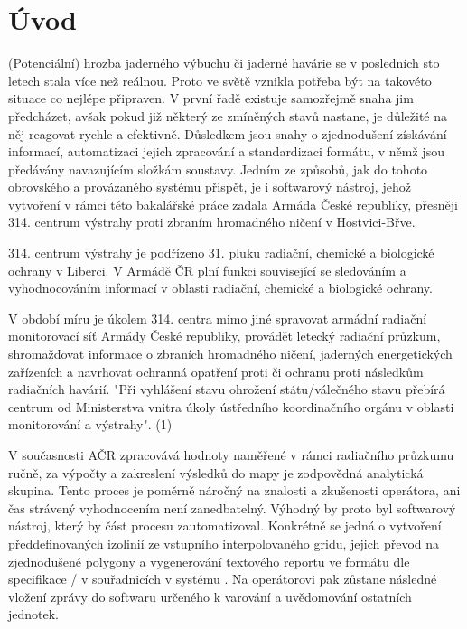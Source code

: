 \chapter{Úvod}
\label{1-uvod}




(Potenciální) hrozba jaderného výbuchu či jaderné havárie se v posledních sto letech stala více než reálnou. Proto ve světě vznikla potřeba být na takovéto situace co nejlépe připraven. V první řadě existuje samozřejmě snaha jim předcházet, avšak pokud již některý ze zmíněných stavů nastane, je důležité na něj reagovat rychle a efektivně. 
Důsledkem jsou snahy o zjednodušení získávání informací, automatizaci jejich zpracování a standardizaci formátu, v němž jsou předávány navazujícím složkám soustavy. Jedním ze způsobů, jak do tohoto obrovského a provázaného systému přispět, je i softwarový nástroj, jehož vytvoření v rámci této bakalářské práce zadala Armáda České republiky, přesněji 314. centrum výstrahy proti zbraním hromadného ničení v Hostvici-Břve.

314. centrum výstrahy  je podřízeno 31. pluku radiační, chemické a biologické ochrany v Liberci. V Armádě ČR plní funkci související se sledováním a vyhodnocováním informací v oblasti radiační, chemické a biologické ochrany.

V období míru je úkolem 314. centra mimo jiné spravovat armádní radiační monitorovací síť Armády České republiky, provádět letecký radiační průzkum, shromažďovat informace o zbraních hromadného ničení, jaderných energetických zařízeních a navrhovat ochranná opatření proti  či ochranu proti následkům radiačních havárií. "Při vyhlášení stavu ohrožení státu/válečného stavu přebírá centrum od Ministerstva vnitra úkoly ústředního koordinačního orgánu v oblasti monitorování a výstrahy". (1)

V současnosti AČR zpracovává hodnoty naměřené v rámci radiačního průzkumu ručně, za výpočty a zakreslení výsledků do mapy je zodpovědná analytická skupina. Tento proces je poměrně náročný na znalosti a zkušenosti operátora, ani čas strávený vyhodnocením není zanedbatelný. Výhodný by proto byl softwarový nástroj, který by část procesu zautomatizoval. Konkrétně se jedná o vytvoření předdefinovaných izolinií ze vstupního interpolovaného gridu, jejich převod na zjednodušené polygony a vygenerování textového reportu ve formátu dle specifikace / v souřadnicích v systému . Na operátorovi pak zůstane následné vložení zprávy do softwaru určeného k varování a uvědomování ostatních jednotek. 


